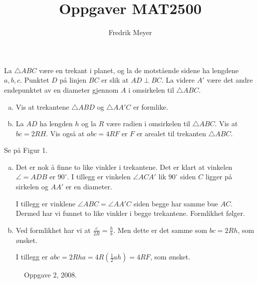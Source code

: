 \documentclass[11pt, norsk]{article}
\begin{document}
\title{Oppgaver MAT2500}
\author{Fredrik Meyer}
\maketitle 

\begin{oppg}
La $\triangle ABC$ være en trekant i planet, og la de motstående sidene ha lengdene $a,b,c$. Punktet $D$ på linjen $BC$ er slik at $AD \perp BC$. La videre $A'$ være det andre endepunktet av en diameter gjennom $A$ i omsirkelen til $\triangle ABC$.

\begin{enumerate}[a)]
\item Vis at trekantene $\triangle ABD$ og $\triangle AA' C$ er formlike.
\item La $AD$ ha lengden $h$ og la $R$ være radien i omsirkelen til $\triangle ABC$. Vis at $bc=2RH$. Vis også at $abc=4RF$ er $F$ er arealet til trekanten $\triangle ABC$.
\end{enumerate}
\end{oppg}

\begin{losn}
Se på Figur 1.
  \begin{enumerate}[a)]
  \item Det er nok å finne to like vinkler i trekantene. Det er klart at vinkelen $\angle=ADB$ er $90^\circ$. I tillegg er vinkelen $\angle ACA'$ lik $90^\circ$ siden $C$ ligger på sirkelen og $AA'$ er en diameter. 

I tillegg er vinklene $\angle ABC=\angle AA'C$ siden begge har samme bue $AC$. Dermed har vi funnet to like vinkler i begge trekantene. Formlikhet følger.
\item Ved formlikhet har vi at $\frac{c}{2R}=\frac{h}{b}$. Men dette er det samme som $bc = 2Rh$, som ønsket. 

I tillegg er $abc = 2Rha=4R(\frac 12 ah)=4RF$, som ønsket.
  \end{enumerate}
\begin{figure}
  \begin{center}
    \caption{Oppgave 2, 2008.}
  \end{center}
  \end{figure}
\end{losn}
\end{document}
